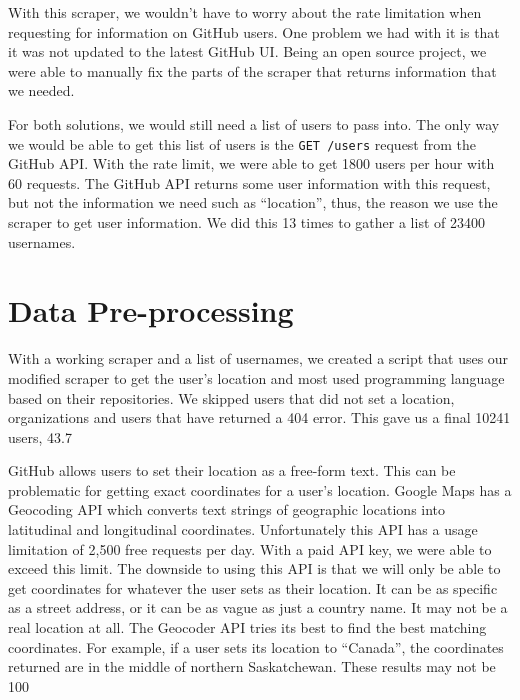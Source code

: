 \documentclass[11pt]{article}
\begin{document}
With this scraper, we wouldn’t have to worry about the rate limitation when requesting for information on GitHub users. One problem we had with it is that it was not updated to the latest GitHub UI. Being an open source project, we were able to manually fix the parts of the scraper that returns information that we needed.

For both solutions, we would still need a list of users to pass into. The only way we would be able to get this list of users is the \texttt{GET /users} request from the GitHub API. With the rate limit, we were able to get 1800 users per hour with 60 requests. The GitHub API returns some user information with this request, but not the information we need such as “location”, thus, the reason we use the scraper to get user information. We did this 13 times to gather a list of 23400 usernames.

\section{Data Pre-processing}

With a working scraper and a list of usernames, we created a script that uses our modified scraper to get the user’s location and most used programming language based on their repositories. We skipped users that did not set a location, organizations and users that have returned a 404 error. This gave us a final 10241 users, 43.7%

GitHub allows users to set their location as a free-form text. This can be problematic for getting exact coordinates for a user's location. Google Maps has a Geocoding API which converts text strings of geographic locations into latitudinal and longitudinal coordinates. Unfortunately this API has a usage limitation of 2,500 free requests per day. With a paid API key, we were able to exceed this limit. The downside to using this API is that we will only be able to get coordinates for whatever the user sets as their location. It can be as specific as a street address, or it can be as vague as just a country name. It may not be a real location at all. The Geocoder API tries its best to find the best matching coordinates. For example, if a user sets its location to “Canada”, the coordinates returned are in the middle of northern Saskatchewan. These results may not be 100%
\end{document}
